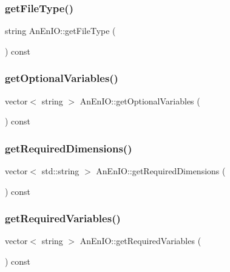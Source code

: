 \subsubsection{\texorpdfstring{get\+File\+Type()}{getFileType()}}
{\footnotesize\ttfamily string An\+En\+I\+O\+::get\+File\+Type (\begin{DoxyParamCaption}{ }\end{DoxyParamCaption}) const}

\mbox{\label{class_an_en_i_o_a50997e1baef5b8bb18d833c8c875a7bc}} 
\subsubsection{\texorpdfstring{get\+Optional\+Variables()}{getOptionalVariables()}}
{\footnotesize\ttfamily vector$<$ string $>$ An\+En\+I\+O\+::get\+Optional\+Variables (\begin{DoxyParamCaption}{ }\end{DoxyParamCaption}) const}

\mbox{\label{class_an_en_i_o_ace777827f2548b3f06ce13f3ce4f4b6b}} 
\subsubsection{\texorpdfstring{get\+Required\+Dimensions()}{getRequiredDimensions()}}
{\footnotesize\ttfamily vector$<$ std\+::string $>$ An\+En\+I\+O\+::get\+Required\+Dimensions (\begin{DoxyParamCaption}{ }\end{DoxyParamCaption}) const}

\mbox{\label{class_an_en_i_o_abd3cbf0e384dd9d610f985fb4131df9b}} 
\subsubsection{\texorpdfstring{get\+Required\+Variables()}{getRequiredVariables()}}
{\footnotesize\ttfamily vector$<$ string $>$ An\+En\+I\+O\+::get\+Required\+Variables (\begin{DoxyParamCaption}{ }\end{DoxyParamCaption}) const}

